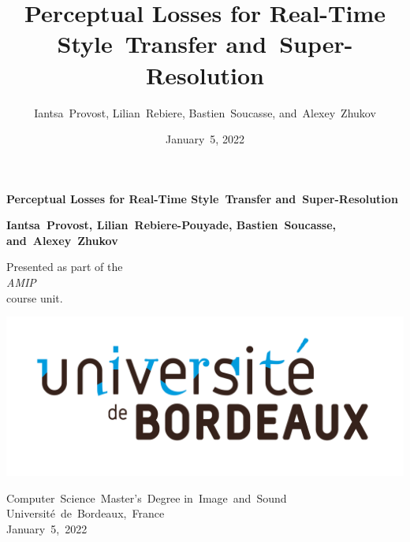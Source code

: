 \documentclass{article}
\title{Perceptual Losses for Real-Time Style~Transfer and~Super-Resolution}
\author{Iantsa~Provost, Lilian~Rebiere, Bastien~Soucasse, and~Alexey~Zhukov}
\date{January~5, 2022}
\begin{document}
{
    \begin{titlepage}
        \begin{center}
            \vspace*{1.5cm}

            \Large

            \textbf{Perceptual Losses for Real-Time Style~Transfer and~Super-Resolution}

            \vspace{.5cm}

            \vspace{1.5cm}

            \large

            \textbf{Iantsa~Provost, Lilian~Rebiere-Pouyade, Bastien~Soucasse, and~Alexey~Zhukov}

            \vfill

            \normalsize

            Presented as part of the\\
            \textit{AMIP}\\
            course unit.

            \vspace{1.5cm}

            \includegraphics[width=.5\textwidth]{images/college-logo.jpg}

            Computer~Science~Master's~Degree in~Image~and~Sound\\
            Université~de~Bordeaux,~France\\
            January~5,~2022
        \end{center}
    \end{titlepage}
    \newpage
    \setcounter{page}{2}
}

{
    \hypersetup{linkcolor=black}
    \tableofcontents
    \newpage
}
\end{document}
